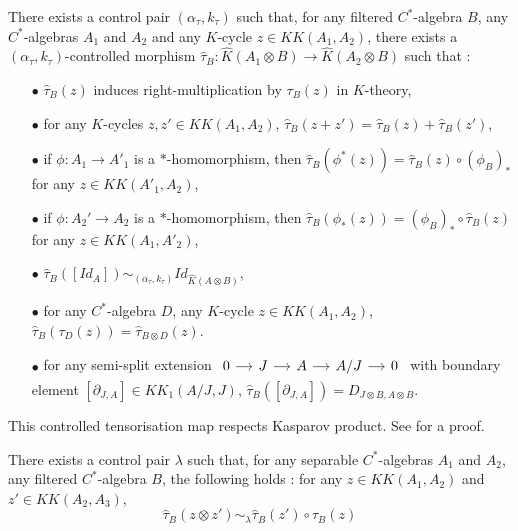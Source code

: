 \begin{thm}\label{tensorization}
There exists a control pair $(\alpha_\tau,k_\tau)$ such that, for any filtered $C^*$-algebra $B$, any $C^*$-algebras $A_1$ and $A_2$ and any $K$-cycle $z\in KK(A_1,A_2)$, there exists a $(\alpha_\tau,k_\tau)$-controlled morphism $\hat \tau_B : \hat K(A_1\otimes B)\rightarrow \hat K(A_2\otimes B)$
such that :
\begin{itemize}
\item[$\bullet$] $\hat \tau_B(z)$ induces right-multiplication by $\tau_B(z)$ in $K$-theory,
\item[$\bullet$] for any $K$-cycles $z,z'\in KK(A_1,A_2)$, $\hat \tau_B(z+z')=\hat\tau_B(z)+\hat\tau_B(z')$,
\item[$\bullet$] if $\phi : A_1\rightarrow A'_1$ is a $*$-homomorphism, then $\hat\tau_B(\phi^*(z)) =  \hat\tau_B(z)\circ (\phi_B)_*$ for any $z\in KK(A'_1,A_2)$,
\item[$\bullet$] if $\phi : A_2'\rightarrow A_2$ is a $*$-homomorphism, then $\hat\tau_B(\phi_*(z)) = (\phi_B)_*\circ \hat\tau_B(z)$ for any $z\in KK(A_1,A'_2)$,
\item[$\bullet$] $\hat \tau_B([Id_A])\sim_{(\alpha_\tau,k_\tau)} Id_{\hat K(A\otimes B)}$,
\item[$\bullet$] for any $C^*$-algebra $D$, any $K$-cycle $z\in KK(A_1,A_2)$, $\hat\tau_B (\tau_D(z))= \hat\tau_{B\otimes D}(z)$.
\item[$\bullet$] for any semi-split extension $\begin{tikzcd}[column sep = small] 0 \arrow{r}& J \arrow{r} & A \arrow{r} & A/J\arrow{r} & 0\end{tikzcd}$ with boundary element $[\partial_{J,A}]\in KK_1(A/J,J)$, $\hat\tau_B([\partial_{J,A}])=D_{J\otimes B,A\otimes B}$.
\end{itemize}
\end{thm}

This controlled tensorisation map respects Kasparov product. See \cite{OY2} for a proof.

\begin{thm}
There exists a control pair $\lambda$ such that, for any separable $C^*$-algebras $A_1$ and $A_2$, any filtered $C^*$-algebra $B$, the following holds : for any $z\in KK(A_1,A_2)$ and $z'\in KK(A_2,A_3)$,
\[\hat\tau_B(z\otimes z')\sim_\lambda \hat\tau_B(z')\circ\hat\tau_B(z)\]
\end{thm}


